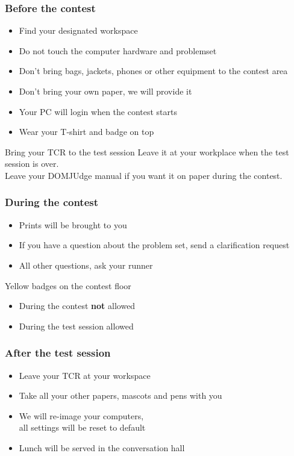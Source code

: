 \documentclass[t]{beamer}
\begin{document}
\begin{frame}
	\frametitle{Before the contest}
	\begin{itemize}
		\item Find your designated workspace
		\item Do not touch the computer hardware and problemset
		\item Don't bring bags, jackets, phones or other equipment to the contest area
		\item Don't bring your own paper, we will provide it
		\item Your PC will login when the contest starts
		\item Wear your T-shirt and badge on top
	\end{itemize}
	\begin{block}
		{Bring your TCR to the test session}
		Leave it at your workplace when the test session is over.\\
		Leave your DOMJUdge manual if you want it on paper during the contest.
	\end{block}
\end{frame}
\begin{frame}
	\frametitle{During the contest}
	\begin{itemize}
		\item Prints will be brought to you 
		\item If you have a question about the problem set, send a clarification request
		\item All other questions, ask your runner
	\end{itemize}
	\begin{block}
		{Yellow badges on the contest floor}
		\begin{itemize}
			\item During the contest \textbf{not} allowed
			\item During the test session allowed
		\end{itemize}
	\end{block}
\end{frame}
\begin{frame}
	\frametitle{After the test session}
	\begin{itemize}
	\item Leave your TCR at your workspace
	\item Take all your other papers, mascots and pens with you
	\item We will re-image your computers,\\ all settings will be reset to default 
	\item Lunch will be served in the conversation hall 
	\end{itemize}
\end{frame}
\end{document}
